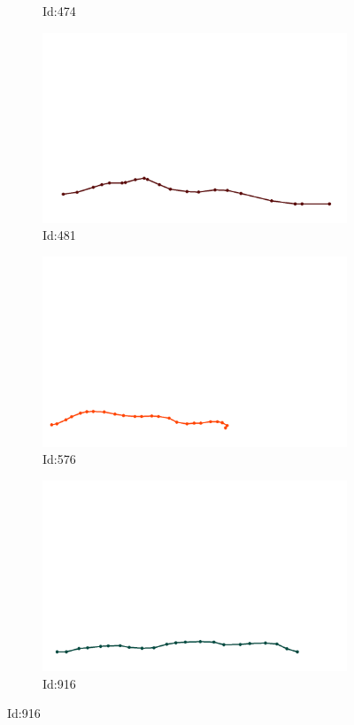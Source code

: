 \documentclass[12pt,twoside]{report}
\begin{document}
\begin{figure}
\begin{subfigure}[b]{0.20\textwidth}
\caption{Id:474}
\end{subfigure}
\begin{subfigure}[b]{0.20\textwidth}
\centering
\includegraphics[width=\textwidth]{../../trajectories/481.png}
\caption{Id:481}
\end{subfigure}
\begin{subfigure}[b]{0.20\textwidth}
\centering
\includegraphics[width=\textwidth]{../../trajectories/576.png}
\caption{Id:576}
\end{subfigure}
\begin{subfigure}[b]{0.20\textwidth}
\centering
\includegraphics[width=\textwidth]{../../trajectories/916.png}
\caption{Id:916}
\end{subfigure}
\end{figure}
\end{document}
